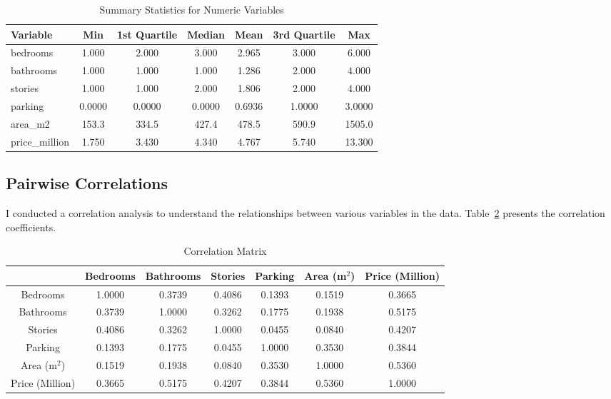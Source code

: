 \documentclass[10pt]{article}
\begin{document}
\begin{table}[H]
  \centering
    \caption{Summary Statistics for Numeric Variables}
  \label{tab:summary-stats}
  \begin{tabular}{lcccccc}
    \toprule
    Variable & Min & 1st Quartile & Median & Mean & 3rd Quartile & Max \\
    \midrule
    bedrooms & 1.000 & 2.000 & 3.000 & 2.965 & 3.000 & 6.000 \\
    bathrooms & 1.000 & 1.000 & 1.000 & 1.286 & 2.000 & 4.000 \\
    stories & 1.000 & 1.000 & 2.000 & 1.806 & 2.000 & 4.000 \\
    parking & 0.0000 & 0.0000 & 0.0000 & 0.6936 & 1.0000 & 3.0000 \\
    area\_m2 & 153.3 & 334.5 & 427.4 & 478.5 & 590.9 & 1505.0 \\
    price\_million & 1.750 & 3.430 & 4.340 & 4.767 & 5.740 & 13.300 \\
    \bottomrule
  \end{tabular}
\end{table}

\subsection{Pairwise Correlations}

I conducted a correlation analysis to understand the relationships between various variables in the data. Table~\ref{tab:3} presents the correlation coefficients. 

\begin{table}[H]
\centering
\begin{tabular}{@{}ccccccc@{}}
\toprule
 & Bedrooms & Bathrooms & Stories & Parking & Area (m$^2$) & Price (Million) \\ \midrule
Bedrooms & 1.0000 & 0.3739 & 0.4086 & 0.1393 & 0.1519 & 0.3665 \\
Bathrooms & 0.3739 & 1.0000 & 0.3262 & 0.1775 & 0.1938 & 0.5175 \\
Stories & 0.4086 & 0.3262 & 1.0000 & 0.0455 & 0.0840 & 0.4207 \\
Parking & 0.1393 & 0.1775 & 0.0455 & 1.0000 & 0.3530 & 0.3844 \\
Area (m$^2$) & 0.1519 & 0.1938 & 0.0840 & 0.3530 & 1.0000 & 0.5360 \\
Price (Million) & 0.3665 & 0.5175 & 0.4207 & 0.3844 & 0.5360 & 1.0000 \\ \bottomrule
\end{tabular}
\caption{Correlation Matrix}
\label{tab:3}
\end{table}
\end{document}
